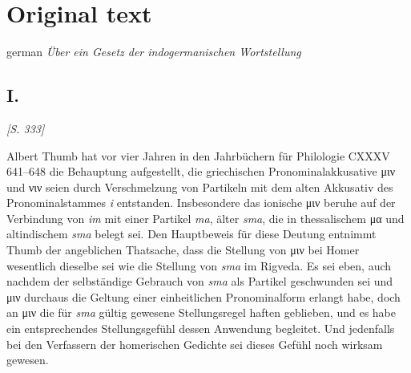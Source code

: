 \chapter{Original text}\label{original}
\begin{otherlanguage*}{german}
\emph{\Large{Über ein Gesetz der indogermanischen Wortstellung}}

\section*{I.}

\hypertarget{p333}{\emph{[S. 333]}}\label{p333} Albert Thumb hat vor vier Jahren in den Jahrbüchern für Philologie CXXXV 641--648 die Behauptung aufgestellt, die griechischen Pronominalakkusative μιν und νιν seien durch Verschmelzung von Partikeln mit dem alten Akkusativ des Pronominalstammes \emph{i} entstanden. Insbesondere das ionische μιν beruhe auf der Verbindung von \emph{im} mit einer Partikel \emph{ma}, älter \textit{sma}, die in thessalischem μα und altindischem \textit{sma} belegt sei. Den Hauptbeweis für diese Deutung entnimmt Thumb der angeblichen Thatsache, dass die Stellung von μιν bei Homer wesentlich dieselbe sei wie die Stellung von \emph{sma} im Rigveda. Es sei eben, auch nachdem der selbständige Gebrauch von \emph{sma} als Partikel geschwunden sei und μιν durchaus die Geltung einer einheitlichen Pronominalform erlangt habe, doch an μιν die für \emph{sma} gültig gewesene Stellungsregel haften geblieben, und es habe ein entsprechendes Stellungsgefühl dessen Anwendung begleitet. Und jedenfalls bei den Verfassern der homerischen Gedichte sei dieses Gefühl noch wirksam gewesen.



\end{otherlanguage*}

